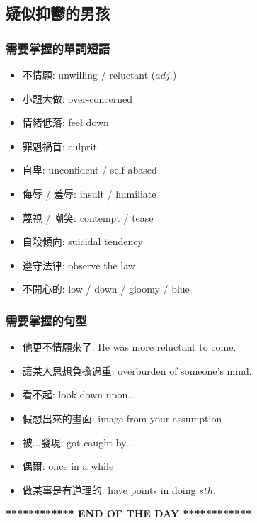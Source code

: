 \subsection{疑似抑鬱的男孩}
\subsubsection*{需要掌握的單詞短語}
\begin{multicols}{2}
\begin{itemize}
  \itemsep0em
  \item 不情願: unwilling / reluctant ($adj.$)
  \item 小題大做: over-concerned
  \item 情緒低落: feel down
  \item 罪魁禍首: culprit
  \item 自卑: unconfident / self-abased
  \item 侮辱 / 羞辱: insult / humiliate
  \item 蔑視 / 嘲笑: contempt / tease
  \item 自殺傾向: suicidal tendency
  \item 遵守法律: observe the law
  \item 不開心的: low / down / gloomy / blue
\end{itemize}
\end{multicols}

\subsubsection*{需要掌握的句型}
\begin{multicols}{2}
\begin{itemize}
  \itemsep0em
  \item 他更不情願來了: He was more reluctant to come.
  \item 讓某人思想負擔過重: overburden of someone's mind.
  \item 看不起: look down upon...
  \item 假想出來的畫面: image from your assumption
  \item 被...發現: got caught by...
  \item 偶爾: once in a while
  \item 做某事是有道理的: have points in doing $sth.$
\end{itemize}
\end{multicols}

\vspace{15mm}

\begin{center}
  \textbf{************ END OF THE DAY ************}
\end{center}